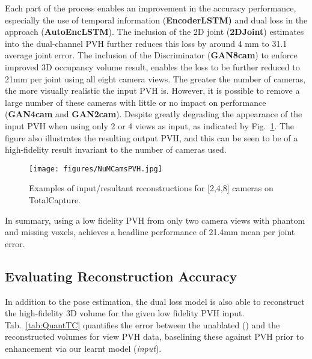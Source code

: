 \documentclass{bmvc2k}
\newcommand{\squeezeup}{\vspace{-2mm}}
\begin{document}
Each part of the process enables an improvement in the accuracy performance, especially the use of temporal information (\textbf{EncoderLSTM)} and dual loss in the approach (\textbf{AutoEncLSTM}). The inclusion of the 2D joint (\textbf{2DJoint}) estimates into the dual-channel PVH further reduces this loss by around 4 mm to 31.1 average joint error. The inclusion of the Discriminator (\textbf{GAN8cam}) to enforce improved 3D occupancy volume result, enables the loss to be further reduced to 21mm per joint using all eight camera views. The greater the number of cameras, the more visually realistic the input PVH is. However, it is possible to remove a large number of these cameras with little or no impact on performance (\textbf{GAN4cam} and \textbf{GAN2cam}). Despite greatly degrading the appearance of the input PVH when using only 2 or 4 views as input, as indicated by Fig.~\ref{fig:NuMCamsPVH}. The figure also illustrates the resulting output PVH, and this can be seen to be of a high-fidelity result invariant to the number of cameras used.
\begin{figure}[t!]
\centering
\texttt{[image: figures/NuMCamsPVH.jpg]}
\caption{Examples of input/resultant reconstructions for [2,4,8] cameras on TotalCapture.}
\label{fig:NuMCamsPVH}
\squeezeup
\squeezeup
\end{figure}
In summary, using a low fidelity PVH  from only two camera views with phantom and missing voxels, achieves a headline performance of 21.4mm mean per joint error.


\subsection{Evaluating Reconstruction Accuracy}

In addition to the pose estimation, the dual loss model is also able to reconstruct the high-fidelity 3D volume for the given low fidelity PVH input. Tab.~\ref{tab:QuantTC} quantifies the error between the unablated () and the reconstructed volumes for  view PVH data, baselining these against  PVH prior to enhancement via our learnt model (\emph{input}). 
\end{document}
